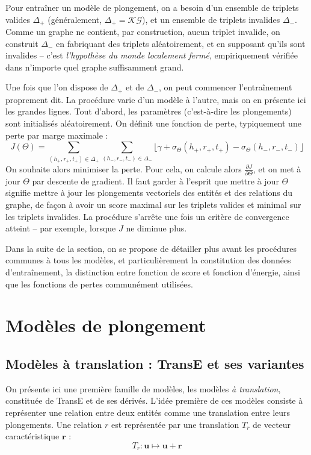 Pour entraîner un modèle de plongement, on a besoin d'un ensemble de triplets valides $\Delta_+$ (généralement, $\Delta_+ = \mathcal{KG}$), et un ensemble de triplets invalides $\Delta_-$. Comme un graphe ne contient, par construction, aucun triplet invalide, on construit $\Delta_-$ en fabriquant des triplets aléatoirement, et en supposant qu'ils sont invalides – c'est \textit{l'hypothèse du monde localement fermé}, empiriquement vérifiée dans n'importe quel graphe suffisamment grand.

Une fois que l'on dispose de $\Delta_+$ et de $\Delta_-$, on peut commencer l'entraînement proprement dit. La procédure varie d'un modèle à l'autre, mais on en présente ici les grandes lignes. Tout d'abord, les paramètres (c'est-à-dire les plongements) sont initialisés aléatoirement. On définit une fonction de perte, typiquement une perte par marge maximale :
$$
J(\Theta) = \sum_{(h_+, r_+, t_+) \in \Delta_+} \sum_{(h_-, r_-, t_-) \in \Delta_-} \lfloor \gamma + \sigma_\Theta(h_+, r_+, t_+) - \sigma_\Theta(h_-, r_-, t_-) \rfloor
$$
On souhaite alors minimiser la perte. Pour cela, on calcule alors $\displaystyle \frac{\partial J}{\partial \Theta}$, et on met à jour $\Theta$ par descente de gradient. Il faut garder à l'esprit que mettre à jour $\Theta$ signifie mettre à jour les plongements vectoriels des entités et des relations du graphe, de façon à avoir un score maximal sur les triplets valides et minimal sur les triplets invalides. La procédure s'arrête une fois un critère de convergence atteint – par exemple, lorsque $J$ ne diminue plus.

Dans la suite de la section, on se propose de détailler plus avant les procédures communes à tous les modèles, et particulièrement la constitution des données d'entraînement, la distinction entre fonction de score et fonction d'énergie, ainsi que les fonctions de pertes communément utilisées. 

\section{Modèles de plongement}
\label{sec:kge-models}

\subsection{Modèles à translation : TransE et ses variantes}
\label{subsec:kge-models-transx}

On présente ici une première famille de modèles, les modèles \textit{à translation}, constituée de TransE et de ses dérivés. L'idée première de ces modèles consiste à représenter une relation entre deux entités comme une translation entre leurs plongements. Une relation $r$ est représentée par une translation $T_r$ de vecteur caractéristique $\mathbf{r}$ :
\begin{equation*}
    T_r : \mathbf{u} \mapsto \mathbf{u + r}
\end{equation*}

